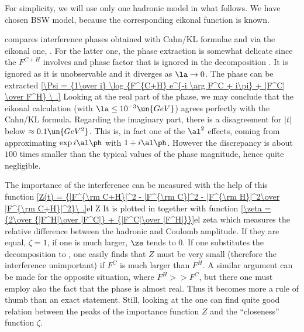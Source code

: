 For simplicity, we will use only one hadronic model in what follows. We have chosen BSW model, because the corresponding eikonal function is known.

 compares interference phases obtained with Cahn/KL formulae and via the eikonal one, . For the latter one, the phase extraction is somewhat delicate since the $F^{C+H}$ involves and phase factor that is ignored in the decomposition . It is ignored as it is unobservable and it diverges as $\la\to 0$. The phase can be extracted
\eqref{\Psi = {1\over i} \log {F^{C+H} e^{-i \arg F^C + i\pi} + |F^C| \over F^H} \ .}{}
Looking at the real part of the phase, we may conclude that the eikonal calculation (with $\la \le 10^{-3}\un{GeV}$) agrees perfectly with the Cahn/KL formula. Regarding the imaginary part, there is a disagreement for $|t|$ below $\approx 0.1\un{GeV^2}$. This is, in fact one of the $\al^2$ effects, coming from approximating $\exp i\al\ph$ with $1+i\al\ph$. However the discrepancy is about $100$ times smaller than the typical values of the phase magnitude, hence quite negligible.


The importance of the interference can be measured with the help of this function
\eqref{Z(t) = {|F^{\rm C+H}|^2 - |F^{\rm C}|^2 - |F^{\rm H}|^2\over |F^{\rm C+H}|^2}\ .}{el Z}
It is plotted in  together with function
\eqref{\zeta = {2\over {|F^H|\over |F^C|} + {|F^C|\over |F^H|}}}{el zeta}
which measures the relative difference between the hadronic and Coulomb amplitude. If they are equal, $\zeta = 1$, if one is much larger, $\ze$ tends to $0$. If one substitutes the decomposition  to , one easily finds that $Z$ must be very small (therefore the interference unimportant) if $F^C$ is much larger than $F^H$. A similar argument can be made for the opposite situation, where $F^H >> F^C$, but there one must employ also the fact that the phase is almost real. Thus it becomes more a rule of thumb than an exact statement. Still, looking at the  one can find quite good relation between the peaks of the importance function $Z$ and the ``closeness'' function $\zeta$.


